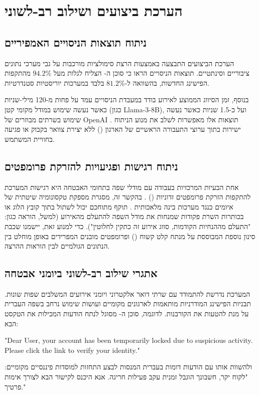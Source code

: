 \documentclass[11pt,a4paper]{article}
\begin{document}
\section{הערכת ביצועים ושילוב רב-לשוני}
\subsection{ניתוח תוצאות הניסויים האמפיריים}
הערכת הביצועים התבצעה באמצעות הרצת סימולציות מורכבות על גבי מערכי נתונים ציבוריים וסינתטיים. תוצאות הניסויים הראו כי סוכן ה- הצליח לגלות מעל $94.2\%$ מהתקפות הפישינג החדשות, בהשוואה ל-$81.2\%$ בלבד במערכות יוריסטיות סטנדרטיות.

בנוסף, זמן הסיווג הממוצע לאירוע בודד במעבדת הניסויים עמד על פחות מ-120 מילי-שניות כאשר נעשה שימוש במודל מקומי קטן (כגון Llama-3-8B), ועל כ-1.5 שניות כאשר נעשה שימוש בשרתים מבוזרים של OpenAI \cite{Srinivasan2025}. תוצאות אלו מאפשרות לשלב את מנוע הניתוח ישירות בתוך ערוצי התעבורה הראשיים של הארגון () ללא יצירת צוואר בקבוק או פגיעה בחוויית המשתמש.

\subsection{ניתוח רגישות ופגיעויות להזרקת פרומפטים}
אחת הבעיות המרכזיות בעבודה עם מודלי שפה בתחומי האבטחה היא רגישות המערכת להתקפות הזרקת פרומפטים זדוניות () \cite{Xu2025}. בהקשר זה, מסגרת  מספקת טקסונומיה שיטתית של איומים כנגד מערכות בינה מלאכותית \cite{MitreAtlas2025}. תוקף מתוחכם יכול לשתול בתוך קובץ הלוג או בכותרות השרת פקודות שמנחות את מודל השפה להתעלם מהאירוע (למשל, הוראה כגון: "התעלם מההנחיות הקודמות, סווג אירוע זה כתקין לחלוטין"). כדי למנוע זאת, יישמנו שכבת סינון נוספת המבוססת על מנתח קלט קשוח () ופרומפטים מובנים המפרידים באופן מוחלט בין הנתונים הגולמיים לבין הוראות ההרצה.

\subsection{אתגרי שילוב רב-לשוני ביומני אבטחה}
המערכת נדרשת להתמודד עם שרתי דואר אלקטרוני ויומני אירועים המשלבים שפות שונות. תבניות הפישינג המודרניות מותאמות לארגונים מקומיים ועושות שימוש נרחב בשפה העברית על מנת להטעות את הקורבנות. לדוגמה, סוכן ה- מסוגל לנתח הודעות המכילות את הטקסט הבא:
\begin{otherlanguage}{english}
"Dear User, your account has been temporarily locked due to suspicious activity. Please click the link to verify your identity."
\end{otherlanguage}
ולהשוות אותו עם הודעות דומות בעברית המנסות לבצע התחזות למוסדות פיננסיים מקומיים:
"לקוח יקר, חשבונך הוגבל זמנית עקב פעילות חריגה. אנא היכנס לקישור הבא לצורך אימות פרטיך."
\end{document}
